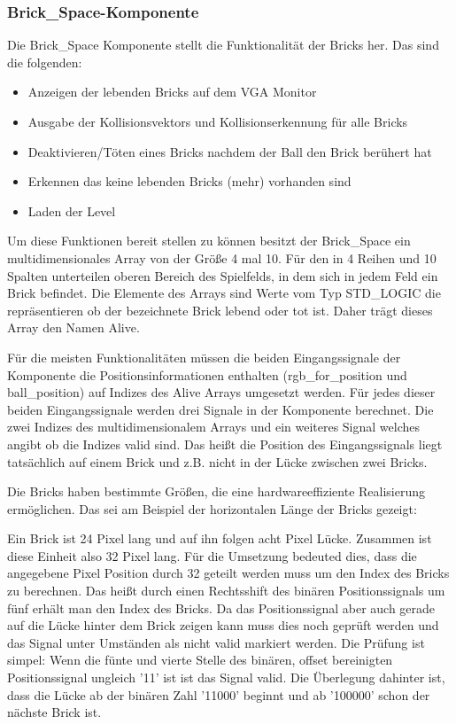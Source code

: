 \documentclass{scrartcl}
\begin{document}
\subsubsection{Brick\_Space-Komponente}
Die Brick\_Space Komponente stellt die Funktionalität der Bricks her. Das sind
die folgenden:
\begin{itemize}
  \item Anzeigen der lebenden Bricks auf dem VGA Monitor
  \item Ausgabe der Kollisionsvektors und Kollisionserkennung für alle Bricks
  \item Deaktivieren/Töten eines Bricks nachdem der Ball den Brick berühert hat
  \item Erkennen das keine lebenden Bricks (mehr) vorhanden sind
  \item Laden der Level
\end{itemize}

Um diese Funktionen bereit stellen zu können besitzt der Brick\_Space ein
multidimensionales Array von der Größe 4 mal 10. Für den in 4 Reihen und 10
Spalten unterteilen oberen Bereich des Spielfelds, in dem sich in jedem Feld
ein Brick befindet. Die Elemente des Arrays sind Werte vom Typ STD\_LOGIC die
repräsentieren ob der bezeichnete Brick lebend oder tot ist. Daher trägt dieses
Array den Namen Alive.

Für die meisten Funktionalitäten müssen die beiden Eingangssignale der
Komponente die Positionsinformationen enthalten (rgb\_for\_position und
ball\_position) auf Indizes des Alive Arrays umgesetzt werden. Für jedes dieser
beiden Eingangssignale werden drei Signale in der Komponente berechnet. Die zwei
Indizes des multidimensionalem Arrays und ein weiteres Signal welches angibt ob
die Indizes valid sind. Das heißt die Position des Eingangssignals liegt
tatsächlich auf einem Brick und z.B. nicht in der Lücke zwischen zwei Bricks.

Die Bricks haben bestimmte Größen, die eine hardwareeffiziente Realisierung
ermöglichen. Das sei am Beispiel der horizontalen Länge der Bricks gezeigt:

Ein Brick ist 24 Pixel lang und auf ihn folgen acht Pixel Lücke. Zusammen
ist diese Einheit also 32 Pixel lang. Für die Umsetzung bedeuted dies, dass
die angegebene Pixel Position durch 32 geteilt werden muss um den Index des
Bricks zu berechnen. Das heißt durch einen Rechtsshift des binären
Positionssignals um fünf erhält man den Index des Bricks. Da das Positionssignal
aber auch gerade auf die Lücke hinter dem Brick zeigen kann muss dies noch
geprüft werden und das Signal unter Umständen als nicht valid markiert werden.
Die Prüfung ist simpel: Wenn die fünte und vierte Stelle des binären, offset
bereinigten Positionssignal ungleich '11' ist ist das Signal valid. Die
Überlegung dahinter ist, dass die Lücke ab der binären Zahl '11000' beginnt und
ab '100000' schon der nächste Brick ist.
\end{document}
